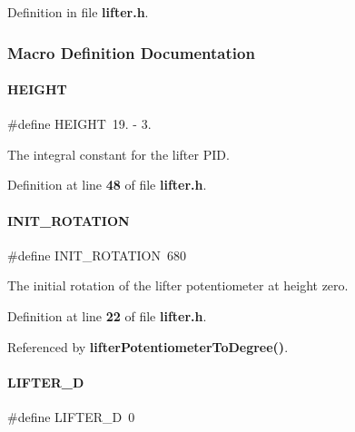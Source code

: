 Definition in file \textbf{ lifter.\+h}.



\subsubsection{Macro Definition Documentation}
\mbox{\label{lifter_8h_aed89bd71aee8be823e8a20ec4e093c1e}} 
\paragraph{H\+E\+I\+G\+HT}
{\footnotesize\ttfamily \#define H\+E\+I\+G\+HT~19. -\/ 3.}



The integral constant for the lifter P\+ID. 



Definition at line \textbf{ 48} of file \textbf{ lifter.\+h}.

\mbox{\label{lifter_8h_a0685a3cee7d5cabe98d2c9c97bed5727}} 
\paragraph{I\+N\+I\+T\+\_\+\+R\+O\+T\+A\+T\+I\+ON}
{\footnotesize\ttfamily \#define I\+N\+I\+T\+\_\+\+R\+O\+T\+A\+T\+I\+ON~680}



The initial rotation of the lifter potentiometer at height zero. 



Definition at line \textbf{ 22} of file \textbf{ lifter.\+h}.



Referenced by \textbf{ lifter\+Potentiometer\+To\+Degree()}.

\mbox{\label{lifter_8h_ad03f59237a197767913457abd53f1780}} 
\paragraph{L\+I\+F\+T\+E\+R\+\_\+D}
{\footnotesize\ttfamily \#define L\+I\+F\+T\+E\+R\+\_\+D~0}



